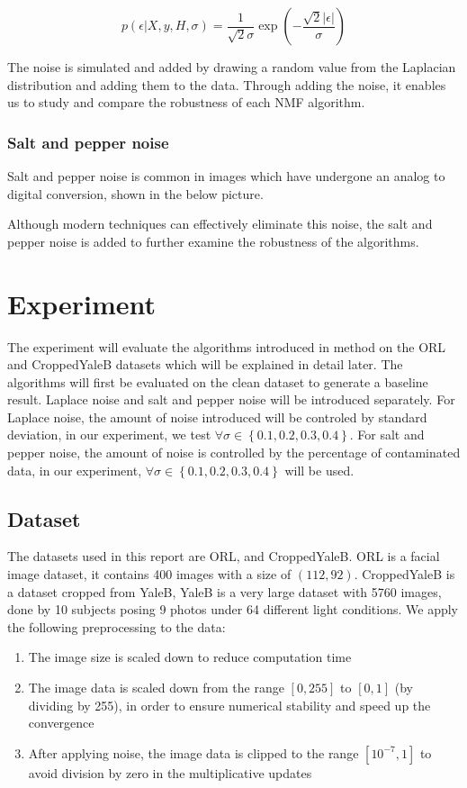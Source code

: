 \documentclass{article} %
\begin{document}
\begin{equation}
p \left ( \epsilon | X,y,H,\sigma \right ) = \frac{1}{\sqrt{2}\sigma} \exp \left ( -\frac{\sqrt{2}\left | \epsilon  \right |}{\sigma} \right )
\end{equation}

The noise is simulated and added by drawing a random value from the Laplacian distribution and adding them to the data. Through adding the noise, it enables us to study and compare the robustness of each NMF algorithm.

\subsubsection{Salt and pepper noise}
Salt and pepper noise is common in images which have undergone an analog to digital conversion, shown in the below picture.

Although modern techniques can effectively eliminate this noise, the salt and pepper noise is added to further examine the robustness of the algorithms.

\section{Experiment}
The experiment will evaluate the algorithms introduced in method on the ORL and CroppedYaleB datasets which will be explained in detail later. The algorithms will first be evaluated on the clean dataset to generate a baseline result. Laplace noise and salt and pepper noise will be introduced separately. For Laplace noise, the amount of noise introduced will be controled by standard deviation, in our experiment, we test $\forall \sigma \in  \left \{ 0.1,0.2,0.3,0.4 \right \}$. For salt and pepper noise, the amount of noise is controlled by the percentage of contaminated data, in our experiment, $\forall \sigma \in  \left \{ 0.1,0.2,0.3,0.4 \right \}$ will be used.

\subsection{Dataset}
The datasets used in this report are ORL, and CroppedYaleB. ORL is a facial image dataset, it contains 400 images with a size of $\left(112,92\right)$. CroppedYaleB is a dataset cropped from YaleB, YaleB is a very large dataset with 5760 images, done by 10 subjects posing 9 photos under 64 different light conditions. We apply the following preprocessing to the data:

\begin{enumerate}
\item The image size is scaled down to reduce computation time
\item The image data is scaled down from the range $\left [ 0,255 \right ]$ to $\left [ 0,1 \right ]$ (by dividing by 255), in order to ensure numerical stability and speed up the convergence
\item After applying noise, the image data is clipped to the range $\left [ 10^{-7},1 \right ]$ to avoid division by zero in the multiplicative updates
\end{enumerate}
\end{document}
